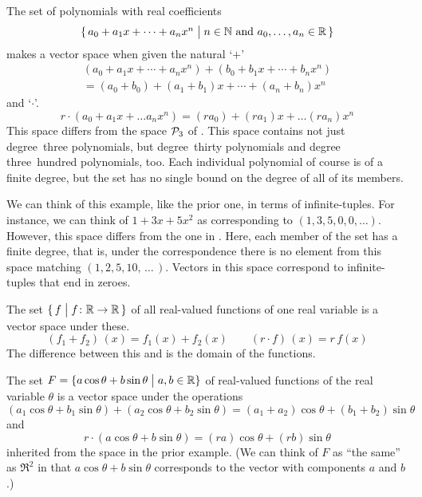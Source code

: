 \begin{example} \label{ex:PolysOfAllFiniteDegrees}
The set of polynomials with real coefficients
\begin{equation*}
 \mbox{$\{\, a_0+a_1x+\cdots+a_nx^n\bigm| n\in\mathbb{N}
    \text{ and } a_0,\ldots,a_n\in\mathbb{R}\,\}$} 
\end{equation*}
makes a vector space when given the natural `$+$' 
\begin{multline*}
  (a_0+a_1x+\cdots+a_nx^n)+(b_0+b_1x+\cdots+b_nx^n)  \\
     =(a_0+b_0)+(a_1+b_1)x+\cdots +(a_n+b_n)x^n
\end{multline*}
and `$\cdot$'.
\begin{equation*}
  r\cdot (a_0+a_1x+\ldots a_nx^n)
   =
  (ra_0)+(ra_1)x+\ldots (ra_n)x^n
\end{equation*}
This space differs from the space $\mathcal{P}_3$ of
.
This space contains not just degree~three polynomials, 
but degree~thirty polynomials and
degree three~hundred polynomials, too.
Each individual polynomial of course is of a finite degree, 
but the set has no single bound on the degree of all of its members.

We can think of this example, like the prior one,  
in terms of infinite-tuples.
For instance, we can think of \( 1+3x+5x^2 \) as corresponding to
\( (1,3,5,0,0,\ldots) \).
However, this space differs from the one in
.
Here, each member of the set has a finite degree, that is,
under the correspondence there is no element from this space 
matching \( (1,2,5,10,\,\ldots\,) \).
Vectors in this space correspond to infinite-tuples
that end in zeroes.
\end{example}

\begin{example}  \label{ex:RealValuedFcns}
The set
\( \mbox{$\{\,f\bigm| \mbox{$f\colon \mathbb{R}\to \mathbb{R}$} \,\}$} \)
of all real-valued functions of one real variable
is a vector space under these.
\begin{equation*}
  (f_1+f_2)\,(x)=f_1(x)+f_2(x)
  \qquad
  (r\cdot f)\,(x)=r\,f(x)
\end{equation*}
The difference between this and  is the
domain of the functions.
\end{example}

\begin{example}\label{ex:ACos+BSin}
The set
\( F=\{ a\cos\theta+b\sin\theta \bigm| a,b\in\mathbb{R}\} \)
of real-valued functions of the real variable \( \theta \)
is a vector space under the operations
\begin{equation*}
  (a_1\cos\theta+b_1\sin\theta)+(a_2\cos\theta+b_2\sin\theta)
    =(a_1+a_2)\cos\theta+(b_1+b_2)\sin\theta
\end{equation*}
and
\begin{equation*}
  r\cdot (a\cos\theta+b\sin\theta)
   =(ra)\cos\theta+(rb)\sin\theta
\end{equation*}
inherited from the space in the prior example.
(We can think of \( F \) as ``the same'' as \( \Re^2 \)
in that $a\cos\theta+b\sin\theta$ corresponds to the vector with
components $a$ and $b$.)
\end{example}

